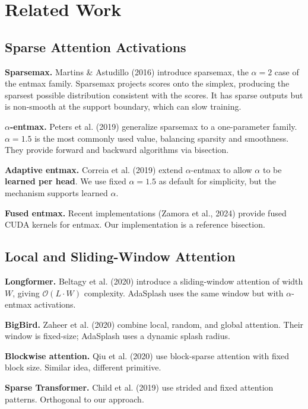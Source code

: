 
\section{Related Work}

\subsection{Sparse Attention Activations}

\textbf{Sparsemax.} Martins \& Astudillo (2016) introduce sparsemax, the $\alpha = 2$ 
case of the entmax family. Sparsemax projects scores onto the simplex, 
producing the sparsest possible distribution consistent with the scores. It 
has sparse outputs but is non-smooth at the support boundary, which can slow 
training.

\textbf{$\alpha$-entmax.} Peters et al. (2019) generalize sparsemax to a one-parameter 
family. $\alpha = 1.5$ is the most commonly used value, balancing sparsity 
and smoothness. They provide forward and backward algorithms via bisection.

\textbf{Adaptive entmax.} Correia et al. (2019) extend $\alpha$-entmax to allow 
$\alpha$ to be \textbf{learned per head}. We use fixed $\alpha = 1.5$ as default 
for simplicity, but the mechanism supports learned $\alpha$.

\textbf{Fused entmax.} Recent implementations (Zamora et al., 2024) provide 
fused CUDA kernels for entmax. Our implementation is a reference bisection.

\subsection{Local and Sliding-Window Attention}

\textbf{Longformer.} Beltagy et al. (2020) introduce a sliding-window attention 
of width $W$, giving $\mathcal{O}(L \cdot W)$ complexity. AdaSplash uses the 
same window but with $\alpha$-entmax activations.

\textbf{BigBird.} Zaheer et al. (2020) combine local, random, and global attention. 
Their window is fixed-size; AdaSplash uses a dynamic splash radius.

\textbf{Blockwise attention.} Qiu et al. (2020) use block-sparse attention with 
fixed block size. Similar idea, different primitive.

\textbf{Sparse Transformer.} Child et al. (2019) use strided and fixed attention 
patterns. Orthogonal to our approach.


